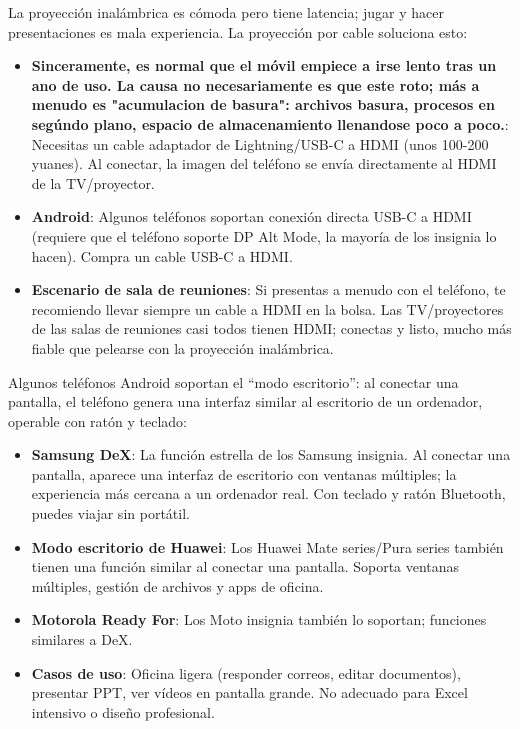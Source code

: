 
La proyección inalámbrica es cómoda pero tiene latencia; jugar y hacer presentaciones es mala experiencia. La proyección por cable soluciona esto:

\begin{itemize}
  \item \textbf{Sinceramente, es normal que el móvil empiece a irse lento tras un ano de uso. La causa no necesariamente es que este roto; más a menudo es "acumulacion de basura": archivos basura, procesos en segúndo plano, espacio de almacenamiento llenandose poco a poco.}: Necesitas un cable adaptador de Lightning/USB-C a HDMI (unos 100-200 yuanes). Al conectar, la imagen del teléfono se envía directamente al HDMI de la TV/proyector.
  \item \textbf{Android}: Algunos teléfonos soportan conexión directa USB-C a HDMI (requiere que el teléfono soporte DP Alt Mode, la mayoría de los insignia lo hacen). Compra un cable USB-C a HDMI.
  \item \textbf{Escenario de sala de reuniones}: Si presentas a menudo con el teléfono, te recomiendo llevar siempre un cable a HDMI en la bolsa. Las TV/proyectores de las salas de reuniones casi todos tienen HDMI; conectas y listo, mucho más fiable que pelearse con la proyección inalámbrica.
\end{itemize}


Algunos teléfonos Android soportan el “modo escritorio”: al conectar una pantalla, el teléfono genera una interfaz similar al escritorio de un ordenador, operable con ratón y teclado:

\begin{itemize}
  \item \textbf{Samsung DeX}: La función estrella de los Samsung insignia. Al conectar una pantalla, aparece una interfaz de escritorio con ventanas múltiples; la experiencia más cercana a un ordenador real. Con teclado y ratón Bluetooth, puedes viajar sin portátil.
  \item \textbf{Modo escritorio de Huawei}: Los Huawei Mate series/Pura series también tienen una función similar al conectar una pantalla. Soporta ventanas múltiples, gestión de archivos y apps de oficina.
  \item \textbf{Motorola Ready For}: Los Moto insignia también lo soportan; funciones similares a DeX.
  \item \textbf{Casos de uso}: Oficina ligera (responder correos, editar documentos), presentar PPT, ver vídeos en pantalla grande. No adecuado para Excel intensivo o diseño profesional.
\end{itemize}

